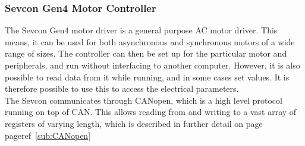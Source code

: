 \subsubsection*{Sevcon Gen4 Motor Controller}
\label{sec:interfacin_with_sevcon}

The Sevcon Gen4 motor driver is a general purpose AC motor driver. 
This means, it can be used for both asynchronous and synchronous motors of a wide range of sizes.
The controller can then be set up for the particular motor and peripherals, and run without interfacing to another computer.
However, it is also possible to read data from it while running, and in some cases set values.
It is therefore possible to use this to access the electrical parameters. \\

The Sevcon communicates through CANopen, which is a high level protocol running on top of CAN.
This allows reading from and writing to a vast array of registers of varying length, which is described in further detail on page pageref~\ref{sub:CANopen}\\


